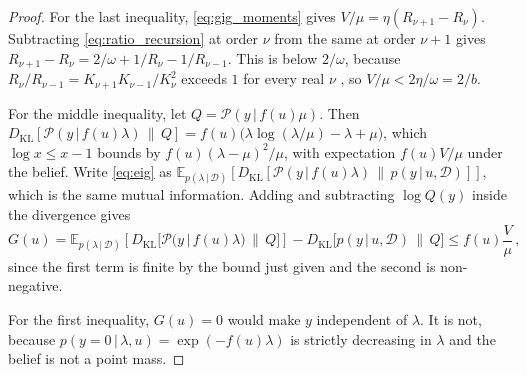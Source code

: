 \documentclass[twoside]{article}
\newcommand\given[1][]{\,#1\vert\,}
\providecommand{\Ex}[2]{\mathbb{E}_{#1}\!\left[#2\right]}
\theoremstyle{plain}
\theoremstyle{definition}
\theoremstyle{remark}
\begin{document}
\begin{proof}
    For the last inequality, \eqref{eq:gig_moments} gives $V / \mu = \eta (R_{\nu + 1} - R_{\nu})$.
    Subtracting \eqref{eq:ratio_recursion} at order $\nu$ from the same at order $\nu + 1$ gives $R_{\nu + 1} - R_{\nu} = 2/\omega + 1/R_{\nu} - 1/R_{\nu - 1}$.
    This is below $2/\omega$, because $R_{\nu} / R_{\nu - 1} = K_{\nu + 1} K_{\nu - 1} / K_{\nu}^{2}$ exceeds $1$ for every real $\nu$ \citep[Theorem~4.1]{jorgensen1982statistical}, so $V / \mu < 2 \eta / \omega = 2 / b$.

    For the middle inequality, let $Q = \mathcal{P}(y \given f(u) \mu)$.
    Then $D_{\text{KL}}[\mathcal{P}(y \given f(u) \lambda) \,\|\, Q] = f(u) \big( \lambda \log(\lambda / \mu) - \lambda + \mu \big)$, which $\log x \leq x - 1$ bounds by $f(u) (\lambda - \mu)^{2} / \mu$, with expectation $f(u) V / \mu$ under the belief.
    Write \eqref{eq:eig} as $\Ex{p(\lambda \given \mathcal{D})}{D_{\text{KL}}[\mathcal{P}(y \given f(u) \lambda) \,\|\, p(y \given u, \mathcal{D})]}$, which is the same mutual information.
    Adding and subtracting $\log Q(y)$ inside the divergence gives
    \begin{equation*}
        G(u) = \Ex{p(\lambda \given \mathcal{D})}{D_{\text{KL}}\big[ \mathcal{P}\big(y \given f(u) \lambda\big) \,\|\, Q \big]} - D_{\text{KL}}\big[ p(y \given u, \mathcal{D}) \,\|\, Q \big] \leq f(u) \frac{V}{\mu} \,,
    \end{equation*}
    since the first term is finite by the bound just given and the second is non-negative.

    For the first inequality, $G(u) = 0$ would make $y$ independent of $\lambda$.
    It is not, because $p(y = 0 \given \lambda, u) = \exp(-f(u) \lambda)$ is strictly decreasing in $\lambda$ and the belief is not a point mass.
\end{proof}
\end{document}
